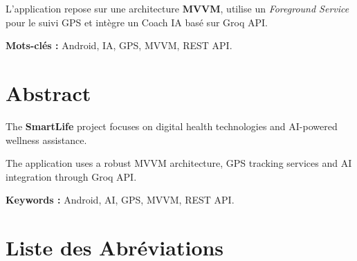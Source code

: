 \documentclass[12pt,a4paper,oneside]{report}
\begin{document}
    L’application repose sur une architecture \textbf{MVVM}, utilise un \textit{Foreground Service} pour le suivi GPS et intègre un Coach IA basé sur Groq API.

    \vspace{0.5cm}

    \textbf{Mots-clés :} Android, IA, GPS, MVVM, REST API.

    \chapter*{Abstract}

    The \textbf{SmartLife} project focuses on digital health technologies and AI-powered wellness assistance.

    The application uses a robust MVVM architecture, GPS tracking services and AI integration through Groq API.

    \vspace{0.5cm}

    \textbf{Keywords :} Android, AI, GPS, MVVM, REST API.

    \chapter*{Liste des Abréviations}

    \begin{acronym}[OSMDroid]


    \end{acronym}

    \newpage
    \tableofcontents

    \newpage
    \listoffigures

    \newpage
    \listoftables
\end{document}

